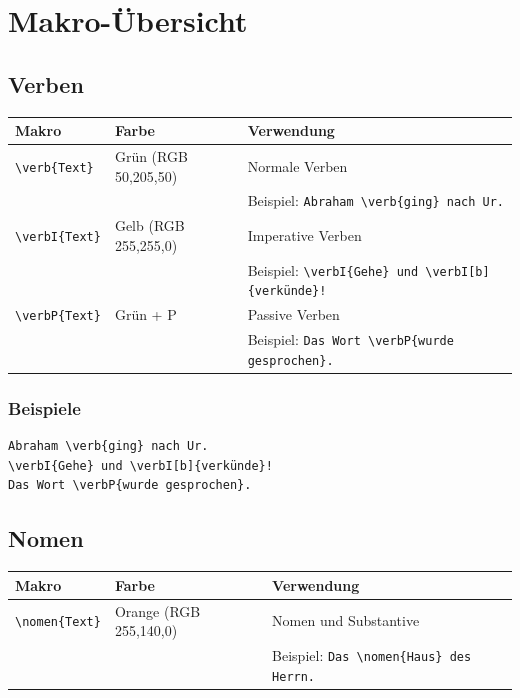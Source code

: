 \documentclass[12pt,a4paper]{scrartcl}
\begin{document}
\section{Makro-Übersicht}

\subsection{Verben}

\begin{longtable}{llp{8cm}}
\toprule
\textbf{Makro} & \textbf{Farbe} & \textbf{Verwendung} \\
\midrule
\endhead
%
\lstinline|\verb{Text}| & Grün (RGB 50,205,50) & Normale Verben \\
& & Beispiel: \lstinline|Abraham \verb{ging} nach Ur.| \\[0.5em]
%
\lstinline|\verbI{Text}| & Gelb (RGB 255,255,0) & Imperative Verben \\
& & Beispiel: \lstinline|\verbI{Gehe} und \verbI[b]{verkünde}!| \\[0.5em]
%
\lstinline|\verbP{Text}| & Grün + P & Passive Verben \\
& & Beispiel: \lstinline|Das Wort \verbP{wurde gesprochen}.| \\
\bottomrule
\end{longtable}

\subsubsection{Beispiele}

\begin{lstlisting}
Abraham \verb{ging} nach Ur.
\verbI{Gehe} und \verbI[b]{verkünde}!
Das Wort \verbP{wurde gesprochen}.
\end{lstlisting}

\subsection{Nomen}

\begin{longtable}{llp{8cm}}
\toprule
\textbf{Makro} & \textbf{Farbe} & \textbf{Verwendung} \\
\midrule
\endhead
%
\lstinline|\nomen{Text}| & Orange (RGB 255,140,0) & Nomen und Substantive \\
& & Beispiel: \lstinline|Das \nomen{Haus} des Herrn.| \\
\bottomrule
\end{longtable}
\end{document}
